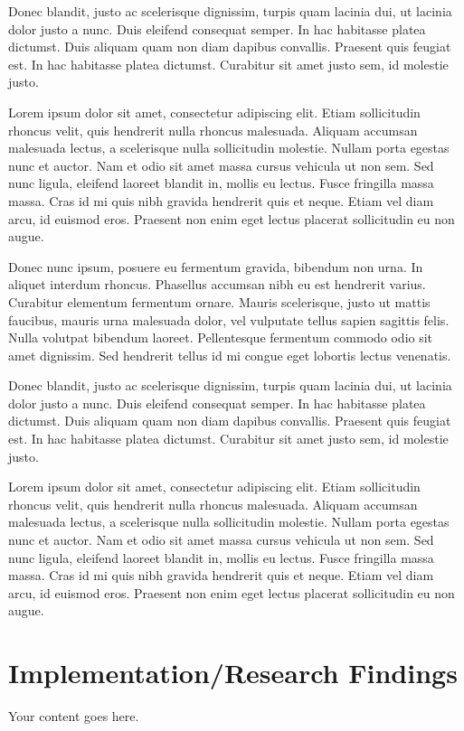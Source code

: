 \documentclass[12pt,lot,lof]{quthesis}
\begin{document}
Donec blandit, justo ac scelerisque dignissim, turpis quam lacinia dui, ut lacinia dolor justo a nunc. Duis eleifend consequat semper. In hac habitasse platea dictumst. Duis aliquam quam non diam dapibus convallis. Praesent quis feugiat est. In hac habitasse platea dictumst. Curabitur sit amet justo sem, id molestie justo.

Lorem ipsum dolor sit amet, consectetur adipiscing elit. Etiam sollicitudin rhoncus velit, quis hendrerit nulla rhoncus malesuada. Aliquam accumsan malesuada lectus, a scelerisque nulla sollicitudin molestie. Nullam porta egestas nunc et auctor. Nam et odio sit amet massa cursus vehicula ut non sem. Sed nunc ligula, eleifend laoreet blandit in, mollis eu lectus. Fusce fringilla massa massa. Cras id mi quis nibh gravida hendrerit quis et neque. Etiam vel diam arcu, id euismod eros. Praesent non enim eget lectus placerat sollicitudin eu non augue.

Donec nunc ipsum, posuere eu fermentum gravida, bibendum non urna. In aliquet interdum rhoncus. Phasellus accumsan nibh eu est hendrerit varius. Curabitur elementum fermentum ornare. Mauris scelerisque, justo ut mattis faucibus, mauris urna malesuada dolor, vel vulputate tellus sapien sagittis felis. Nulla volutpat bibendum laoreet. Pellentesque fermentum commodo odio sit amet dignissim. Sed hendrerit tellus id mi congue eget lobortis lectus venenatis.

Donec blandit, justo ac scelerisque dignissim, turpis quam lacinia dui, ut lacinia dolor justo a nunc. Duis eleifend consequat semper. In hac habitasse platea dictumst. Duis aliquam quam non diam dapibus convallis. Praesent quis feugiat est. In hac habitasse platea dictumst. Curabitur sit amet justo sem, id molestie justo.

Lorem ipsum dolor sit amet, consectetur adipiscing elit. Etiam sollicitudin rhoncus velit, quis hendrerit nulla rhoncus malesuada. Aliquam accumsan malesuada lectus, a scelerisque nulla sollicitudin molestie. Nullam porta egestas nunc et auctor. Nam et odio sit amet massa cursus vehicula ut non sem. Sed nunc ligula, eleifend laoreet blandit in, mollis eu lectus. Fusce fringilla massa massa. Cras id mi quis nibh gravida hendrerit quis et neque. Etiam vel diam arcu, id euismod eros. Praesent non enim eget lectus placerat sollicitudin eu non augue.

\chapter{Implementation/Research Findings}
Your content goes here.
\end{document}
